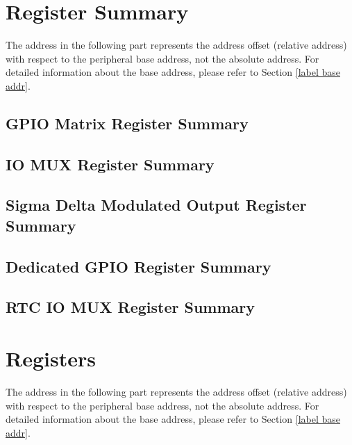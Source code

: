 \documentclass[main\_\_EN.tex]{subfiles}
\begin{document}
\hypertarget{iomuxgpio-reg-summ}{}
\section{Register Summary}

The address in the following part represents the address offset (relative address) with respect to the peripheral base address, not the absolute address. For detailed information about the base address, please refer to Section \ref{label base addr}.


\subsection{GPIO Matrix Register Summary}



\subsection{IO MUX Register Summary}



\subsection{Sigma Delta Modulated Output Register Summary}



\subsection{Dedicated GPIO Register Summary}



\subsection{RTC IO MUX Register Summary}


\section{Registers}
The address in the following part represents the address offset (relative address) with respect to the peripheral base address, not the absolute address. For detailed information about the base address, please refer to Section \ref{label base addr}.
\end{document}
